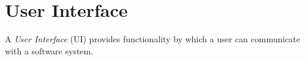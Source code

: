 %
%
%
%
%
%

\section{User Interface}
\label{user_interface_heading}

A \emph{User Interface} (UI) provides functionality by which a user can
communicate with a software system.




